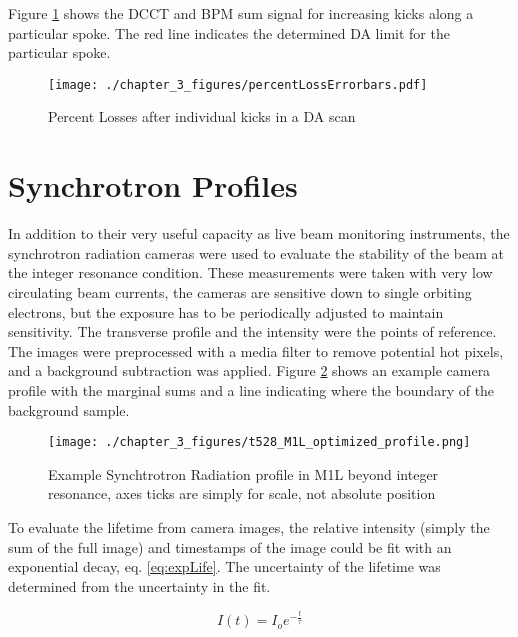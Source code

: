Figure \ref{fig:daLimit} shows the DCCT and BPM sum signal for increasing kicks along a particular spoke. The red line indicates the determined DA limit for the particular spoke.

\begin{figure}
	\centering
	\texttt{[image: ./chapter\_3\_figures/percentLossErrorbars.pdf]}
	\caption{Percent Losses after individual kicks in a DA scan}
	\label{fig:daLimit}
\end{figure}

\section{Synchrotron Profiles} \label{sec:synchProfiles}
In addition to their very useful capacity as live beam monitoring instruments, the synchrotron radiation cameras were used to evaluate the stability of the beam at the integer resonance condition. These measurements were taken with very low circulating beam currents, the cameras are sensitive down to single orbiting electrons, but the exposure has to be periodically adjusted to maintain sensitivity. The transverse profile and the intensity were the points of reference. The images were preprocessed with a media filter to remove potential hot pixels, and a background subtraction was applied. Figure \ref{fig:synchBackground} shows an example camera profile with the marginal sums and a line indicating where the boundary of the background sample.

\begin{figure}
	\centering
	\texttt{[image: ./chapter\_3\_figures/t528\_M1L\_optimized\_profile.png]}
	\caption{Example Synchtrotron Radiation profile in M1L beyond integer resonance, axes ticks are simply for scale, not absolute position}
	\label{fig:synchBackground}
\end{figure}

To evaluate the lifetime from camera images, the relative intensity (simply the sum of the full image) and timestamps of the image could be fit with an exponential decay, eq. \ref{eq:expLife}. The uncertainty of the lifetime was determined from the uncertainty in the fit.

\begin{equation}
	I(t) = I_o e^{-\frac{t}{\tau}}
	\label{eq:expLife}
\end{equation}
